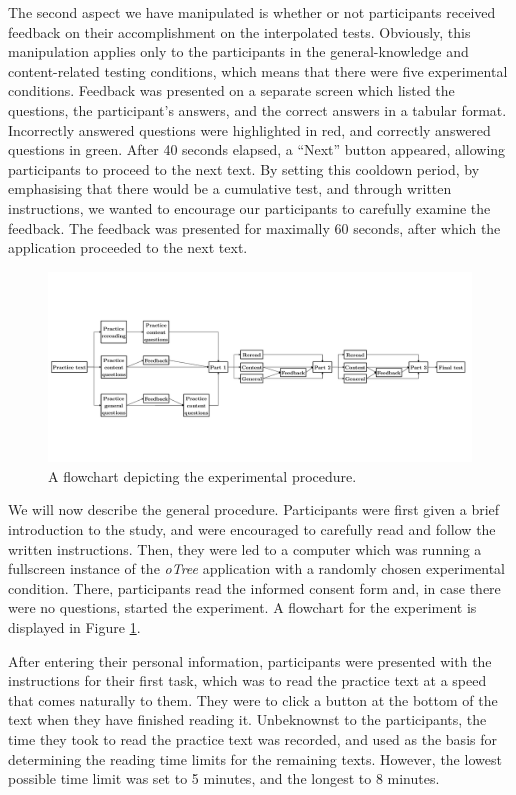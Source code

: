 \documentclass[11pt,]{article}
\begin{document}
The second aspect we have manipulated is whether or not participants
received feedback on their accomplishment on the interpolated tests.
Obviously, this manipulation applies only to the participants in the
general-knowledge and content-related testing conditions, which means
that there were five experimental conditions. Feedback was presented on
a separate screen which listed the questions, the participant's answers,
and the correct answers in a tabular format. Incorrectly answered
questions were highlighted in red, and correctly answered questions in
green. After 40 seconds elapsed, a ``Next'' button appeared, allowing
participants to proceed to the next text. By setting this cooldown
period, by emphasising that there would be a cumulative test, and
through written instructions, we wanted to encourage our participants to
carefully examine the feedback. The feedback was presented for maximally
60 seconds, after which the application proceeded to the next text.

\begin{figure}[p]
  \centering
  \includegraphics[width = 1.3\textwidth, keepaspectratio, angle = 90, trim = 0 0 0 0]{../images/flowchart/procedure.pdf}
  \caption{A flowchart depicting the experimental procedure.}
  \label{flowchart}
\end{figure}

We will now describe the general procedure. Participants were first
given a brief introduction to the study, and were encouraged to
carefully read and follow the written instructions. Then, they were led
to a computer which was running a fullscreen instance of the
\textit{oTree} application with a randomly chosen experimental
condition. There, participants read the informed consent form and, in
case there were no questions, started the experiment. A flowchart for
the experiment is displayed in Figure \ref{flowchart}.

After entering their personal information, participants were presented
with the instructions for their first task, which was to read the
practice text at a speed that comes naturally to them. They were to
click a button at the bottom of the text when they have finished reading
it. Unbeknownst to the participants, the time they took to read the
practice text was recorded, and used as the basis for determining the
reading time limits for the remaining texts. However, the lowest
possible time limit was set to 5 minutes, and the longest to 8 minutes.
\end{document}
